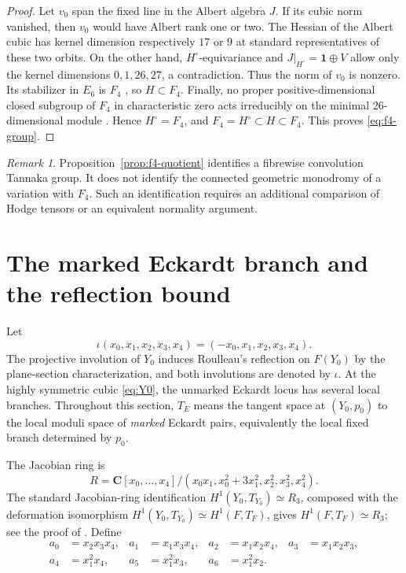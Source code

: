 \documentclass[11pt,reqno]{amsart}
\numberwithin{equation}{section}
\theoremstyle{definition}
\theoremstyle{remark}
\newtheorem{remark}[theorem]{Remark}
\newcommand{\C}{\mathbf C}
\begin{document}
\begin{proof}
Let $v_0$ span the fixed line in the Albert algebra $J$.  If its cubic norm vanished, then $v_0$ would have Albert rank one or two.  The Hessian of the Albert cubic has kernel dimension respectively $17$ or $9$ at standard representatives of these two orbits.  On the other hand, $H^\circ$-equivariance and $J|_{H^\circ}=\mathbf1\oplus V$ allow only the kernel dimensions $0,1,26,27$, a contradiction.  Thus the norm of $v_0$ is nonzero.  Its stabilizer in $E_6$ is $F_4$ \cite{SpringerVeldkamp2000}, so $H\subset F_4$.  Finally, no proper positive-dimensional closed subgroup of $F_4$ in characteristic zero acts irreducibly on the minimal $26$-dimensional module \cite[Theorem~1 and Table~1.2]{LiebeckSeitz2004}.  Hence $H^\circ=F_4$, and $F_4=H^\circ\subset H\subset F_4$.  This proves \eqref{eq:f4-group}.
\end{proof}

\begin{remark}\label{rem:f4-not-monodromy}
Proposition~\ref{prop:f4-quotient} identifies a fibrewise convolution Tannaka group.  It does not identify the connected geometric monodromy of a variation with $F_4$.  Such an identification requires an additional comparison of Hodge tensors or an equivalent normality argument.
\end{remark}

\section{The marked Eckardt branch and the reflection bound}\label{sec:eckardt-algebra}

Let
\[
\iota(x_0,x_1,x_2,x_3,x_4)=(-x_0,x_1,x_2,x_3,x_4).
\]
The projective involution of $Y_0$ induces Roulleau's reflection on $F(Y_0)$ by the plane-section characterization, and both involutions are denoted by $\iota$.
At the highly symmetric cubic \eqref{eq:Y0}, the unmarked Eckardt locus has several local branches.  Throughout this section, $T_E$ means the tangent space at $(Y_0,p_0)$ to the local moduli space of \emph{marked} Eckardt pairs, equivalently the local fixed branch determined by $p_0$.

The Jacobian ring is
\begin{equation}\label{eq:jacobian-ring}
R=\C[x_0,\ldots,x_4]/(x_0x_1,x_0^2+3x_1^2,x_2^2,x_3^2,x_4^2).
\end{equation}
The standard Jacobian-ring identification $H^1(Y_0,T_{Y_0})\simeq R_3$, composed with the deformation isomorphism $H^1(Y_0,T_{Y_0})\simeq H^1(F,T_F)$, gives
$H^1(F,T_F)\simeq R_3$; see the proof of \cite[Proposition~3.8]{KLM2026}.  Define
\begin{align*}
a_0&=x_2x_3x_4,&
a_1&=x_1x_3x_4,&
a_2&=x_1x_2x_4,&
a_3&=x_1x_2x_3,\\
a_4&=x_1^2x_4,&
a_5&=x_1^2x_3,&
a_6&=x_1^2x_2.
\end{align*}
\end{document}

